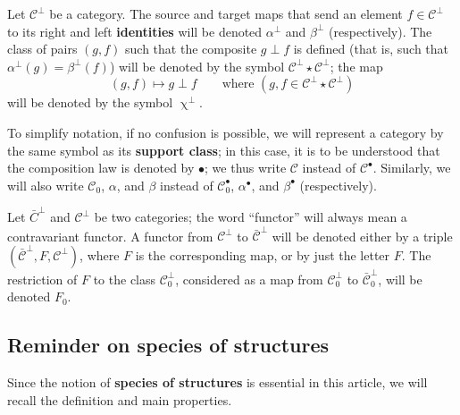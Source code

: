 \documentclass{article}
\newcommand{\oldpage}[1]{\marginpar{\footnotesize$\Big\vert$ \textit{p.~#1}}}
\newcommand{\unsure}[1]{{\color{purple}\textbf{#1}}}
\newcommand{\CC}{\mathcal{C}}
\newcommand{\dotc}{{\mathbin{\bullet}}}
\newcommand{\botc}{{\mathbin{\bot}}}
\newcommand{\comp}{\upchi}
\begin{document}
Let $\CC^\botc$ be a category.
The source and target maps that send an element $f\in\CC^\botc$ to its right and left \unsure{identities} will be denoted $\alpha^\botc$ and $\beta^\botc$ (respectively).
The class of pairs $(g,f)$ such that the composite $g\botc f$ is defined (that is, such that $\alpha^\botc(g)=\beta^\botc(f)$) will be denoted by the symbol $\CC^\botc\star\CC^\botc$;
the map
\[
  (g,f) \mapsto g\botc f
  \qquad\text{where }(g,f\in\CC^\botc\star\CC^\botc)
\]
will be denoted by the symbol $\comp^\botc$.

\oldpage{351}
To simplify notation, if no confusion is possible, we will represent a category by the same symbol as its \unsure{support class};
in this case, it is to be understood that the composition law is denoted by $\dotc$;
we thus write $\CC$ instead of $\CC^\dotc$.
Similarly, we will also write $\CC_0$, $\alpha$, and $\beta$ instead of $\CC_0^\dotc$, $\alpha^\dotc$, and $\beta^\dotc$ (respectively).

Let $\bar{C}^\botc$ and $\CC^\botc$ be two categories;
the word ``functor'' will always mean a contravariant functor.
A functor from $\CC^\botc$ to $\bar{\CC}^\botc$ will be denoted either by a triple $(\bar{\CC}^\botc,F,\CC^\botc)$, where $F$ is the corresponding map, or by just the letter $F$.
The restriction of $F$ to the class $\CC_0^\botc$, considered as a map from $\CC_0^\botc$ to $\bar{\CC}_0^\botc$, will be denoted $F_0$.



\subsection{Reminder on \unsure{species of structures}}

Since the notion of \unsure{species of structures} \cite{3a} is essential in this article, we will recall the definition and main properties.
\end{document}
